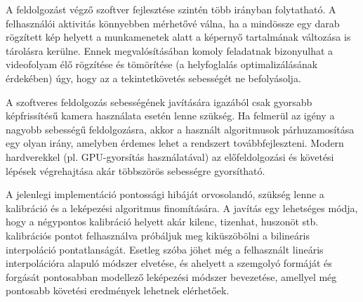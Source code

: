 \bigskip

A feldolgozást végző szoftver fejlesztése szintén több irányban folytatható. A felhasználói aktivitás könnyebben mérhetővé válna, ha a mindössze egy darab rögzített kép helyett a munkamenetek alatt a képernyő tartalmának változása is tárolásra kerülne. Ennek megvalósításában komoly feladatnak bizonyulhat a videofolyam élő rögzítése és tömörítése (a helyfoglalás optimalizálásának érdekében) úgy, hogy az a tekintetkövetés sebességét ne befolyásolja.

A szoftveres feldolgozás sebességének javítására igazából csak gyorsabb képfrissítésű kamera használata esetén lenne szükség. Ha felmerül az igény a nagyobb sebességű feldolgozásra, akkor a használt algoritmusok párhuzamosítása egy olyan irány, amelyben érdemes lehet a rendszert továbbfejleszteni. Modern hardverekkel (pl. GPU-gyorsítás használatával) az előfeldolgozási és követési lépések végrehajtása akár többszörös sebességre gyorsítható.

A jelenlegi implementáció pontossági hibáját orvosolandó, szükség lenne a kalibráció és a leképezési algoritmus finomítására. A javítás egy lehetséges módja, hogy a négypontos kalibráció helyett akár kilenc, tizenhat, huszonöt stb. kalibrációs pontot felhasználva próbáljuk meg kiküszöbölni a bilineáris interpoláció pontatlanságát. Esetleg szóba jöhet még a felhasznált lineáris interpolációra alapuló módszer elvetése, és ahelyett a szemgolyó formáját és forgását pontosabban modellező leképezési módszer bevezetése, amellyel még pontosabb követési eredmények lehetnek elérhetőek.